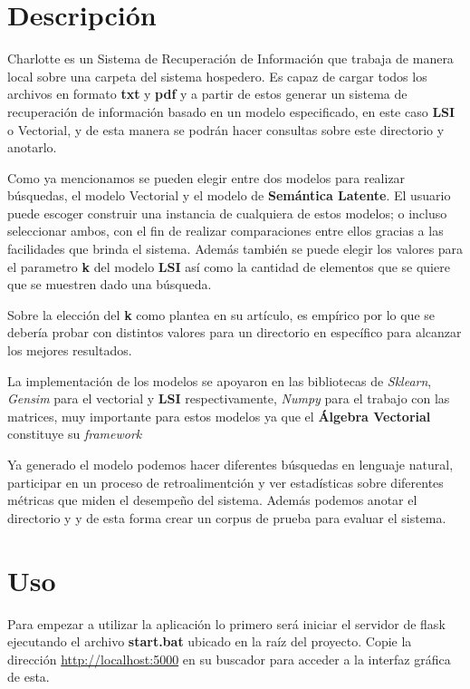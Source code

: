 \documentclass{llncs}
\begin{document}
\section{Descripción}%

  Charlotte es un Sistema de Recuperación de Información que trabaja de manera local sobre una carpeta del sistema hospedero. Es capaz de cargar todos los archivos en formato \textbf{txt} y \textbf{pdf} y a partir de estos generar un sistema de recuperación de información basado en un modelo especificado, en este caso \textbf{LSI} o Vectorial, y de esta manera se podrán hacer consultas sobre este directorio y anotarlo.

  Como ya mencionamos se pueden elegir entre dos modelos para realizar búsquedas, el modelo Vectorial y el modelo de \textbf{Semántica Latente}. El usuario puede escoger construir una instancia de cualquiera de estos modelos; o incluso seleccionar ambos, con el fin de realizar comparaciones entre ellos gracias a las facilidades que brinda el sistema. Además también se puede elegir los valores para el parametro \textbf{k} del modelo \textbf{LSI} así como la cantidad de elementos que se quiere que se muestren dado una búsqueda.

  Sobre la elección del \textbf{k} como plantea \cite{Daniel} en su artículo, es empírico por lo que se debería probar con distintos valores para un directorio en específico para alcanzar los mejores resultados.

  La implementación de los modelos se apoyaron en las bibliotecas de \emph{Sklearn}, \emph{Gensim} para el vectorial y \textbf{LSI} respectivamente, \emph{Numpy} para el trabajo con las matrices, muy importante para estos modelos ya que el \textbf{Álgebra Vectorial} constituye su \emph{framework}  

  Ya generado el modelo podemos hacer diferentes búsquedas en lenguaje natural, participar en un proceso de retroalimentción y ver estadísticas sobre diferentes métricas que miden el desempeño del sistema. Además podemos anotar el directorio y y de esta forma crear un corpus de prueba para evaluar el sistema. 

\section{Uso}

  Para empezar a utilizar la aplicación lo primero será iniciar el servidor de flask ejecutando el archivo \textbf{start.bat} ubicado en la raíz del proyecto. Copie la dirección \href{http://localhost:5000}{http://localhost:5000} en su buscador para acceder a la interfaz gráfica de esta.
\end{document}
